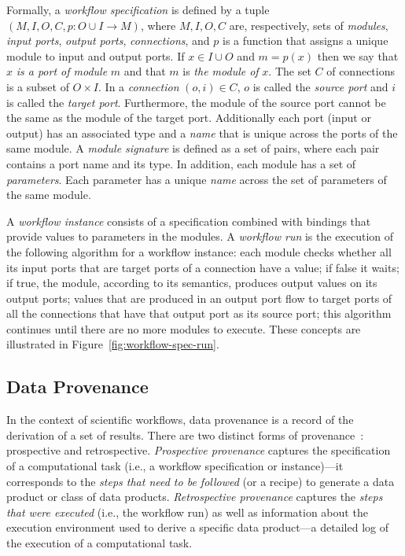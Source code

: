 \documentclass[12pt]{iopart}
\newcommand{\ie}{i.e.,\xspace}
\begin{document}
Formally, a \emph{workflow specification} is defined by a tuple
$(M,I,O,C,p:O \cup I \rightarrow M)$, where $M, I, O, C$ are,
respectively, sets of {\it modules}, {\it input ports}, {\it output
 ports}, {\it connections}, and $p$ is a function that assigns a
unique module to input and output ports. If $x \in I \cup O$ and $m =
p(x)$ then we say that $x$ {\it is a port of module} $m$ and that $m$
is {\it the module of} $x$. The set $C$ of connections is a subset of
$O \times I$. In a {\it connection} $(o,i) \in C$, $o$ is called the
{\it source port} and $i$ is called the {\it target
 port}. Furthermore, the module of the source port cannot be the same
as the module of the target port. Additionally each port (input
or output) has an associated type and a {\it name} that is unique
across the ports of the same module. A {\it module signature} is
defined as a set of pairs, where each pair contains a port name and
its type. In addition, each module has a set of {\it parameters}. Each parameter
has a unique {\it name} across the set of parameters of the same
module.

A \emph{workflow instance} consists of a specification combined with
bindings that provide values to parameters in the modules. A {\it
 workflow run} is the execution of the following algorithm for a
workflow instance: each module checks whether all its input ports that
are target ports of a connection have a value; if false it waits; if
true, the module, according to its semantics, produces output values
on its output ports; values that are produced in an output port flow
to target ports of all the connections that have that output port as
its source port; this algorithm continues until there are no more
modules to execute.
%
These concepts are illustrated in Figure~\ref{fig:workflow-spec-run}.

\subsection{Data Provenance}
In the context of scientific workflows, data provenance is a record of
the derivation of a set of results. There are two distinct forms of
provenance~\cite{VDL:Challenge06}: prospective and retrospective.
\emph{Prospective provenance} captures the specification of a
computational task (\ie a workflow specification or instance)---it
corresponds to the \emph{steps that need to be followed} (or a recipe)
to generate a data product or class of data products.
\emph{Retrospective provenance} captures the \emph{steps that were
 executed} (\ie the workflow run) as well as information about the
execution environment used to derive a specific data product---a
detailed log of the execution of a computational task.
\end{document}
